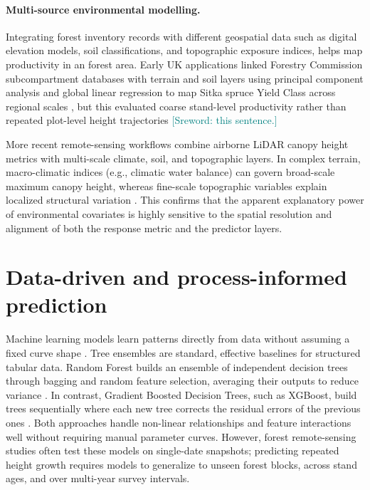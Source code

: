 \documentclass[logo,msc,ai]{infthesis}           %
\newcommand{\sr}[1]{\textcolor{teal}{[Sreword: #1]}}
\newcommand{\ai}[1]{\textcolor{brown}{[AI: #1]}}
\begin{document}
\paragraph*{Multi-source environmental modelling.}
Integrating forest inventory records with different geospatial data such as digital elevation models, soil classifications, and topographic exposure indices, helps map productivity in an forest area. Early UK applications linked Forestry Commission subcompartment databases with terrain and soil layers using principal component analysis and global linear regression to map Sitka spruce Yield Class across regional scales \cite{bateman1998Using_C1_SS}, but this evaluated coarse stand-level productivity rather than repeated plot-level height trajectories \sr{this sentence.}

More recent remote-sensing workflows combine airborne LiDAR canopy height metrics with multi-scale climate, soil, and topographic layers. In complex terrain, macro-climatic indices (e.g., climatic water balance) can govern broad-scale maximum canopy height, whereas fine-scale topographic variables explain localized structural variation \cite{fricker2019More_C3_LID}. This confirms that the apparent explanatory power of environmental covariates is highly sensitive to the spatial resolution and alignment of both the response metric and the predictor layers.



\section{Data-driven and process-informed prediction}
\label{sec:background-prediction}

Machine learning models learn patterns directly from data without assuming a fixed curve shape \cite{lee2018Machine_C3_LID}. Tree ensembles are standard, effective baselines for structured tabular data. Random Forest builds an ensemble of independent decision trees through bagging and random feature selection, averaging their outputs to reduce variance \cite{breiman2001RandomForest_C4_NN}. In contrast, Gradient Boosted Decision Trees, such as XGBoost, build trees sequentially where each new tree corrects the residual errors of the previous ones \cite{chen2016XGBoost_C4_NN}. Both approaches handle non-linear relationships and feature interactions well without requiring manual parameter curves. However, forest remote-sensing studies often test these models on single-date snapshots; predicting repeated height growth requires models to generalize to unseen forest blocks, across stand ages, and over multi-year survey intervals.
\end{document}
